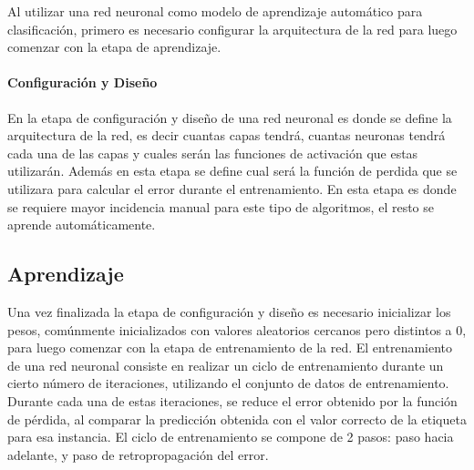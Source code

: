 \documentclass[a4paper,11pt,spanish]{book}
\begin{document}
	Al utilizar una red neuronal como modelo de aprendizaje automático para clasificación, primero es necesario configurar la arquitectura de la red para luego comenzar 
	con la etapa de aprendizaje.

      \paragraph{Configuración y Diseño}
	En la etapa de configuración y diseño de una red neuronal es donde se define la arquitectura de la red, es decir cuantas capas tendrá, cuantas neuronas tendrá 
	cada una de las capas y cuales serán las funciones de activación que estas utilizarán.
	Además en esta etapa se define cual será la función de perdida que se utilizara para calcular el error durante el entrenamiento.
	En esta etapa es donde se requiere mayor incidencia manual para este tipo de algoritmos, el resto se aprende automáticamente.

      \subsection {Aprendizaje}
	Una vez finalizada la etapa de configuración y diseño es necesario inicializar los pesos, comúnmente inicializados con valores aleatorios cercanos pero distintos a 0, 
	para luego comenzar con la etapa de entrenamiento de la red.
	El entrenamiento de una red neuronal consiste en realizar un ciclo de entrenamiento durante un cierto número de iteraciones, utilizando el conjunto de datos de 
	entrenamiento. 
	Durante cada una de estas iteraciones, se reduce el error obtenido por la función de pérdida, al comparar la predicción obtenida con el valor correcto de la 
	etiqueta para esa instancia.
	El ciclo de entrenamiento se compone de 2 pasos: paso hacia adelante, y paso de retropropagación del error.
	
\end{document}
